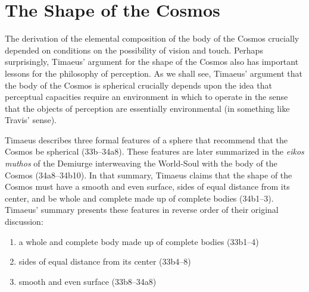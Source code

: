 
\section{The Shape of the Cosmos} %
\label{sec:the_shape_of_the_Cosmos}

The derivation of the elemental composition of the body of the Cosmos crucially depended on conditions on the possibility of vision and touch. Perhaps surprisingly, Timaeus' argument for the shape of the Cosmos also has important lessons for the philosophy of perception. As we shall see, Timaeus' argument that the body of the Cosmos is spherical crucially depends upon the idea that perceptual capacities require an environment in which to operate in the sense that the objects of perception are essentially environmental (in something like Travis' \citeyear{Travis:2005ys} sense). 

Timaeus describes three formal features of a sphere that recommend that the Cosmos be spherical (33b--34a8). These features are later summarized in the \emph{eikos muthos} of the Demiurge interweaving the World-Soul with the body of the Cosmos (34a8--34b10). In that summary, Timaeus claims that the shape of the Cosmos must have a smooth and even surface, sides of equal distance from its center, and be whole and complete made up of complete bodies (34b1--3). Timaeus' summary presents these features in reverse order of their original discussion:
\begin{enumerate}[(1)]
	\item a whole and complete body made up of complete bodies (33b1--4)
	\item sides of equal distance from its center (33b4--8)
	\item smooth and even surface (33b8--34a8)
\end{enumerate}

